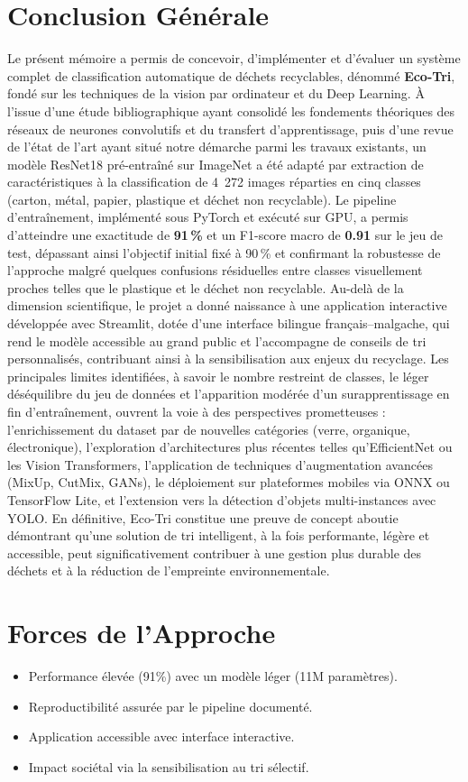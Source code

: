 \documentclass[12pt,a4paper]{report}
\begin{document}
\section{Conclusion Générale}
Le présent mémoire a permis de concevoir, d'implémenter et d'évaluer un système complet de classification automatique de déchets recyclables, dénommé \textbf{Eco-Tri}, fondé sur les techniques de la vision par ordinateur et du Deep Learning. À l'issue d'une étude bibliographique ayant consolidé les fondements théoriques des réseaux de neurones convolutifs et du transfert d'apprentissage, puis d'une revue de l'état de l'art ayant situé notre démarche parmi les travaux existants, un modèle ResNet18 pré-entraîné sur ImageNet a été adapté par extraction de caractéristiques à la classification de 4~272 images réparties en cinq classes (carton, métal, papier, plastique et déchet non recyclable). Le pipeline d'entraînement, implémenté sous PyTorch et exécuté sur GPU, a permis d'atteindre une exactitude de \textbf{91\,\%} et un F1-score macro de \textbf{0.91} sur le jeu de test, dépassant ainsi l'objectif initial fixé à 90\,\% et confirmant la robustesse de l'approche malgré quelques confusions résiduelles entre classes visuellement proches telles que le plastique et le déchet non recyclable. Au-delà de la dimension scientifique, le projet a donné naissance à une application interactive développée avec Streamlit, dotée d'une interface bilingue français--malgache, qui rend le modèle accessible au grand public et l'accompagne de conseils de tri personnalisés, contribuant ainsi à la sensibilisation aux enjeux du recyclage. Les principales limites identifiées, à savoir le nombre restreint de classes, le léger déséquilibre du jeu de données et l'apparition modérée d'un surapprentissage en fin d'entraînement, ouvrent la voie à des perspectives prometteuses : l'enrichissement du dataset par de nouvelles catégories (verre, organique, électronique), l'exploration d'architectures plus récentes telles qu'EfficientNet ou les Vision Transformers, l'application de techniques d'augmentation avancées (MixUp, CutMix, GANs), le déploiement sur plateformes mobiles via ONNX ou TensorFlow Lite, et l'extension vers la détection d'objets multi-instances avec YOLO. En définitive, Eco-Tri constitue une preuve de concept aboutie démontrant qu'une solution de tri intelligent, à la fois performante, légère et accessible, peut significativement contribuer à une gestion plus durable des déchets et à la réduction de l'empreinte environnementale.

\section{Forces de l'Approche}
\begin{itemize}
    \item Performance élevée (91\%) avec un modèle léger (11M paramètres).
    \item Reproductibilité assurée par le pipeline documenté.
    \item Application accessible avec interface interactive.
    \item Impact sociétal via la sensibilisation au tri sélectif.
\end{itemize}
\end{document}
